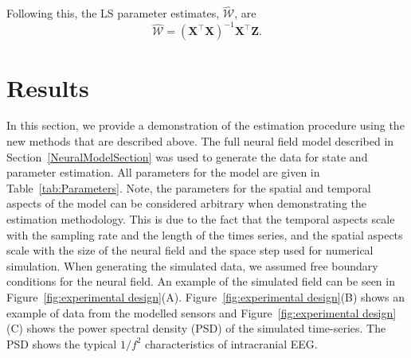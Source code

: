 \documentclass[10pt]{article}
\begin{document}
Following this, the LS parameter estimates, $ \mathcal{\hat{W}}$, are
\begin{equation}
	\mathcal{\hat{W}}=(\mathbf X^\top\mathbf X)^{-1}\mathbf X^\top\mathbf Z. 
\end{equation}

\section*{Results}\label{ResultsSection} In this section, we provide a demonstration of the estimation procedure using the new methods that are described above. The full neural field model described in Section~\ref{NeuralModelSection} was used to generate the data for state and parameter estimation. All parameters for the model are given in Table~\ref{tab:Parameters}. Note, the parameters for the spatial and temporal aspects of the model can be considered arbitrary when demonstrating the estimation methodology. This is due to the fact that the temporal aspects scale with the sampling rate and the length of the times series, and the spatial aspects scale with the size of the neural field and the space step used for numerical simulation. When generating the simulated data, we assumed free boundary conditions for the neural field. An example of the simulated field can be seen in Figure~\ref{fig:experimental design}(A). Figure~\ref{fig:experimental design}(B) shows an example of data from the modelled sensors and Figure~\ref{fig:experimental design}(C) shows the power spectral density (PSD) of the simulated time-series. The PSD shows the typical $1/f^2$ characteristics of intracranial EEG.
\end{document}

